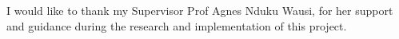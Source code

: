 I would like to thank my Supervisor Prof Agnes Nduku Wausi, for her support and guidance during the research and implementation of this project.

